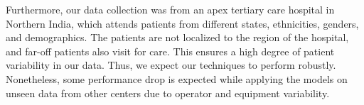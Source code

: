 Furthermore, our data collection was from an apex tertiary care hospital in Northern India, which attends patients from different states, ethnicities, genders, and demographics. The patients are not localized to the region of the hospital, and far-off patients also visit for care. This ensures a high degree of patient variability in our data. Thus, we expect our techniques to perform robustly. Nonetheless, some performance drop is expected while applying the models on unseen data from other centers due to operator and equipment variability. %




